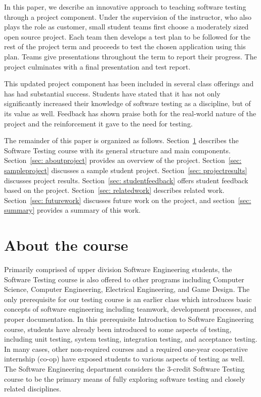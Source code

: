 \documentclass{sig-alternate}
\begin{document}
In this paper, we describe an innovative approach to teaching software testing through a project component. Under the supervision of the instructor, who also plays the role as customer, small student teams first choose a moderately sized open source project. Each team then develops a test plan to be followed for the rest of the project term and proceeds to test the chosen application using this plan. Teams give presentations throughout the term to report their progress. The project culminates with a final presentation and test report.

This updated project component has been included in several class offerings and has had substantial success. Students have stated that it has not only significantly increased their knowledge of software testing as a discipline, but of its value as well. Feedback has shown praise both for the real-world nature of the project and the reinforcement it gave to the need for testing.

The remainder of this paper is organized as follows. Section~\ref{sec: aboutcourse} describes the Software Testing course with its general structure and main components. Section~\ref{sec: aboutproject} provides an overview of the project. Section~\ref{sec: sampleproject} discusses a sample student project. Section~\ref{sec: projectresults} discusses project results. Section~\ref{sec: studentfeedback} offers student feedback based on the project. Section~\ref{sec: relatedwork} describes related work. Section~\ref{sec: futurework} discusses future work on the project, and section~\ref{sec: summary} provides a summary of this work.

\section{About the course}
\label{sec: aboutcourse}

Primarily comprised of upper division Software Engineering students, the Software Testing course is also offered to other programs including Computer Science, Computer Engineering, Electrical Engineering, and Game Design. The only prerequisite for our testing course is an earlier class which introduces basic concepts of software engineering including teamwork, development processes, and proper documentation. In this prerequisite Introduction to Software Engineering course, students have already been introduced to some aspects of testing, including unit testing, system testing, integration testing, and acceptance testing. In many cases, other non-required courses and a required one-year cooperative internship (co-op) have exposed students to various aspects of testing as well. The Software Engineering department considers the 3-credit Software Testing course to be the primary means of fully exploring software testing and closely related disciplines.
\end{document}
